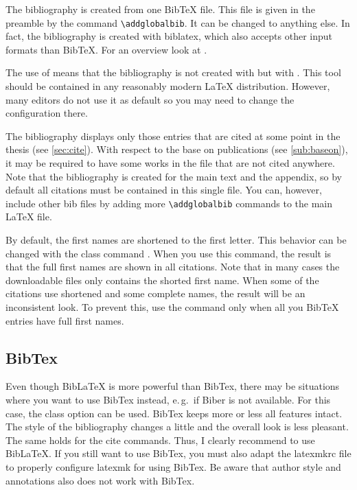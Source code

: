 The bibliography is created from one BibTeX file. This file is given in the
preamble by the command \verb!\addglobalbib!. It can be changed to anything
else. In fact, the bibliography is created with biblatex, which also accepts
other input formats than BibTeX. For an overview look at \citet{web:biblatex}.

The use of  means that the bibliography is not created with
 but with . This tool should be contained in any
reasonably modern \LaTeX{} distribution. However, many editors do not use it
as default so you may need to change the configuration there.

The bibliography displays only those entries that are cited at some point in
the thesis (see \autoref{sec:cite}).  With respect to the base on publications
(see \autoref{sub:baseon}), it may be required to have some works in the file
that are not cited anywhere. Note that the bibliography is created for the
main text and the appendix, so by default all citations must be contained in
this single file. You can, however, include other bib files by adding more
\verb!\addglobalbib!  commands to the main \LaTeX{} file.

By default, the first names are shortened to the first letter. This behavior
can be changed with the class command
. When you use this command, the
result is that the full first names are shown in all citations. Note that in
many cases the downloadable  files only contains the shorted
first name.  When some of the citations use shortened and some complete names,
the result will be an inconsistent look. To prevent this, use the command only
when all you BibTeX entries have full first names.

\subsection{BibTex}%
\label{sub:bibtex}

Even though BibLaTeX is more powerful than BibTex, there may be situations
where you want to use BibTex instead, e.\,g.\ if Biber is not available. For
this case, the class option  can be used.
BibTex keeps more or less all features intact. The style of the bibliography
changes a little and the overall look is less pleasant.  The same holds for
the cite commands. Thus, I clearly recommend to use BibLaTeX. If you still
want to use BibTex, you must also adapt the latexmkrc file to properly
configure latexmk for using BibTex.  Be aware that author style and
annotations also does not work with BibTex.

